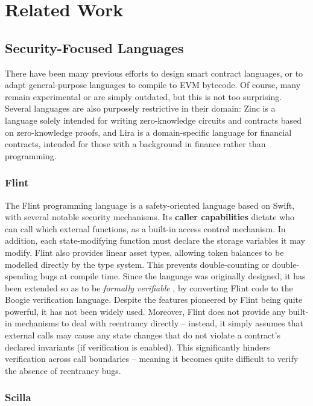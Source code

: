 \chapter{Related Work}\label{ch:related_work}

\section{Security-Focused Languages}

There have been many previous efforts to design smart contract languages, or to adapt general-purpose languages to compile to EVM bytecode. Of course, many remain experimental or are simply outdated, but this is not too surprising. Several languages are also purposely restrictive in their domain: Zinc \cite{zinc} is a language solely intended for writing zero-knowledge circuits and contracts based on zero-knowledge proofs, and Lira \cite{lira} \cite{lira-evm} is a domain-specific language for financial contracts, intended for those with a background in finance rather than programming.

\subsection{Flint}

The Flint programming language \cite{flint} is a safety-oriented language based on Swift, with several notable security mechanisms. Its \textbf{caller capabilities} dictate who can call which external functions, as a built-in access control mechanism. In addition, each state-modifying function must declare the storage variables it may modify. Flint also provides linear asset types, allowing token balances to be modelled directly by the type system. This prevents double-counting or double-spending bugs at compile time. Since the language was originally designed, it has been extended so as to be \textit{formally verifiable} \cite{flint-verif}, by converting Flint code to the Boogie verification language. Despite the features pioneered by Flint being quite powerful, it has not been widely used. Moreover, Flint does not provide any built-in mechanisms to deal with reentrancy directly -- instead, it simply assumes that external calls may cause any state changes that do not violate a contract's declared invariants (if verification is enabled). This significantly hinders verification across call boundaries -- meaning it becomes quite difficult to verify the absence of reentrancy bugs. 

\subsection{Scilla}

